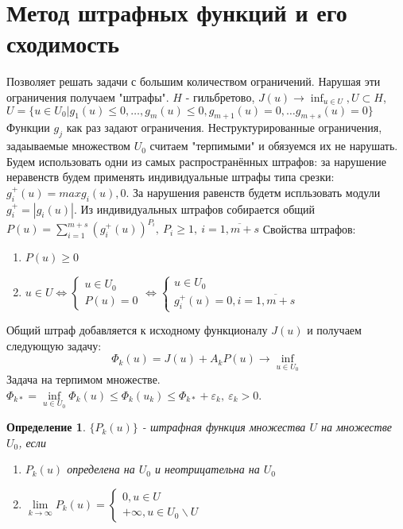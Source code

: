 \documentclass[9pt, a4paper]{extarticle}
\newtheorem*{definition}{Определение}
\begin{document}
\section{Метод штрафных функций и его сходимость}
	Позволяет решать задачи с большим количеством ограничений. Нарушая эти ограничения получаем "штрафы". \newline
	$H$ - гильбретово, $J(u) \to \inf_{u\in U}, U\subset H$, $U = \{u \in U_0 \vert g_1(u) \leq 0, \dots, g_m(u) \leq 0, g_{m+1}(u) =0, \dots g_{m+s}(u) = 0\}$ Функции $g_j$ как раз задают ограничения. Неструктурированные ограничения, задаываемые множеством $U_0$ считаем "терпимыми" и обязуемся их не нарушать. \newline
	Будем использовать одни из самых распространённых штрафов: за нарушение неравенств будем применять индивидуальные штрафы типа срезки: $g_i^+ (u) = max{g_i(u), 0}$. За нарушения равенств будетм испльзовать модули $g_i^+ = |g_i(u)|$. Из индивидуальных штрафов собирается общий $P(u) = \sum\limits_{i=1}^{m+s} (g_i^+(u))^{P_i}, \ P_i \geq 1, \ i =\overline{1, m+s}$\newline
	Свойства штрафов:
	\begin{enumerate}
		\item $P(u) \geq 0$
		\item $u\in U \Leftrightarrow \begin{cases} u\in U_0 \\ P(u) = 0 \end{cases} \Leftrightarrow \begin{cases} u\in U_0 \\ g_i^+(u) = 0 , i = \overline{1, m+s}\end{cases}$
		
	\end{enumerate}
	Общий штраф добавляется к исходному функционалу $J(u)$ и получаем следующую задачу: 
	\begin{equation*}
		\Phi_k(u) = J(u) + A_kP(u) \to \inf_{u \in U_0}
	\end{equation*}
	Задача на терпимом множестве. $\Phi_{k*} = \inf\limits_{u\in U_0} \Phi_k(u) \leq \Phi_k(u_k) \leq \Phi_{k*} + \varepsilon_k, \ \varepsilon_k > 0$. 
	\begin{definition}
		$\{P_k(u)\}$ - штрафная функция множества $U$ на множестве $U_0$, если
		\begin{enumerate}
			\item $P_k(u)$ определена на $U_0$ и неотрицательна на $U_0$
			\item $\lim\limits_{k\to\infty} P_k(u) = \begin{cases}
				0, u\in U\\
				+\infty, u \in U_0 \backslash U
			\end{cases}$
		\end{enumerate}
	\end{definition}
	
\end{document}
